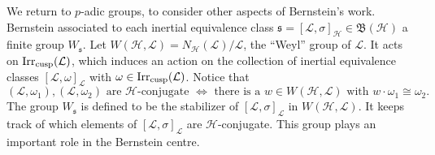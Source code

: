 \documentclass[11pt]{amsart}
\theoremstyle{definition}
\newcommand{\mf}{\mathfrak}
\def\Irr{{\rm Irr}}
\def\cL{{\mathcal L}}
\def\cH{{\mathcal H}}
\def\fs{{\mathfrak s}}
\def\cusp{{\rm cusp}}
\begin{document}
We return to $p$-adic groups, to consider other aspects of Bernstein's work.
Bernstein associated to each inertial equivalence class $\fs = 
[\cL,\sigma]_\cH \in \mf B (\cH)$ a finite group $W_\fs$. Let
$W(\cH,\cL) = N_\cH (\cL) / \cL$, the ``Weyl'' group of $\cL$. It acts on
$\Irr_\cusp (\cL)$, which induces an action on the collection of inertial
equivalence classes $[\cL,\omega]_\cL$ with $\omega \in \Irr_\cusp (\cL)$.
Notice that
\[
(\cL,\omega_1), (\cL,\omega_2) \text{ are } \cH\text{-conjugate }
\Longleftrightarrow \text{ there is a } w \in W(\cH,\cL) \text{ with } 
w \cdot \omega_1 \cong \omega_2 .
\]
The group $W_\fs$ is defined to be the stabilizer of $[\cL,\sigma]_\cL$
in $W(\cH,\cL)$. It keeps track of which elements of $[\cL,\sigma]_\cL$
are $\cH$-conjugate. This group plays an important role in the Bernstein centre.
\end{document}
